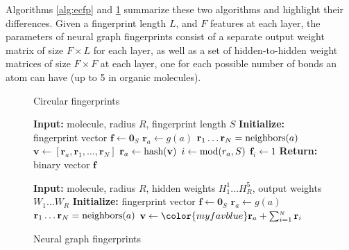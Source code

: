 \documentclass{article}
\newcommand{\vv}{\mathbf{v}}
\newcommand{\vf}{\mathbf{f}}
\newcommand{\vr}{\mathbf{r}}
\newcommand{\vzero}{\mathbf{0}}
\begin{document}
Algorithms \ref{alg:ecfp} and \ref{alg:neural} summarize these two algorithms and highlight their differences.
Given a fingerprint length $L$, and $F$ features at each layer, the parameters of neural graph fingerprints consist of a separate output weight matrix of size $F \times L$ for each layer, as well as a set of hidden-to-hidden weight matrices of size $F \times F$ at each layer, one for each possible number of bonds an atom can have (up to 5 in organic molecules).

\algrenewcommand\algorithmicindent{1.3em}%
\begin{figure}[t]
 \begin{minipage}[t]{0.49\columnwidth}
 \begin{algorithm}[H]
\caption{Circular fingerprints} 
\label{alg:ecfp} 
\begin{algorithmic}[1]
\State \textbf{Input:} {molecule, radius $R$, fingerprint length $S$}
\State \textbf{Initialize:} {fingerprint vector $\vf \leftarrow \vzero_S$}
    \State $\vr_a \leftarrow g(a)$ 
\EndFor
{} 
		\State $\vr_{1} \dots \vr_{N} = \textnormal{neighbors}(a)$
		\State $\vv \leftarrow [\vr_a, \vr_{1}, \dots, \vr_{N}]$ 
		\State $\vr_a \leftarrow \textnormal{hash}(\vv)$ 
		\State $i \leftarrow \textnormal{mod}(r_a, S)$ 		
		\State $\vf_{i} \leftarrow 1$ 
	\EndFor
\EndFor
\State \textbf{Return:} {binary vector $\vf$}
\end{algorithmic}
\end{algorithm}
\end{minipage}
\hfill
\begin{minipage}[t]{0.49\columnwidth}
\begin{algorithm}[H]
\caption{Neural graph fingerprints} 
\label{alg:neural} 
\begin{algorithmic}[1]
\State \textbf{Input:} {molecule, radius $R$, {\color{myfavblue} hidden weights $H_1^1 \dots H_R^5$, output weights $W_1 \dots W_R$}}
\State \textbf{Initialize:} {fingerprint vector $\vf \leftarrow \vzero_S$}
	\State $\vr_a \leftarrow g(a)$ 
\EndFor
{} 
		\State $\vr_{1} \dots \vr_{N} = \textnormal{neighbors}(a)$
		\State $\vv \leftarrow {\color{myfavblue} \vr_a + \sum_{i=1}^{_{N}} \vr_{i}}$ 

\end{algorithmic}
\end{algorithm}
\end{minipage}
\end{figure}
\end{document}
